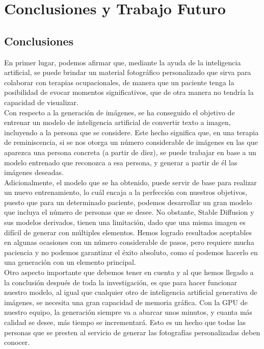 \chapter{Conclusiones y Trabajo Futuro}
\label{cap:conclusiones}

\section{Conclusiones}

En primer lugar, podemos afirmar que, mediante la ayuda de la inteligencia artificial, se puede brindar un material fotográfico personalizado que sirva para colaborar con terapias ocupacionales, de manera que un paciente tenga la posibilidad de evocar momentos significativos, que de otra manera no tendría la capacidad de visualizar.\\

Con respecto a la generación de imágenes, se ha conseguido el objetivo de entrenar un modelo de inteligencia artificial de convertir texto a imagen, incluyendo a la persona que se considere. Este hecho significa que, en una terapia de reminiscencia, si se nos otorga un número considerable de imágenes en las que aparezca una persona concreta (a partir de diez), se puede trabajar en base a un modelo entrenado que reconozca a esa persona, y generar a partir de él las imágenes deseadas.\\

Adicionalmente, el modelo que se ha obtenido, puede servir de base para realizar un nuevo entrenamiento, lo cuál encaja a la perfección con nuestros objetivos, puesto que para un determinado paciente, podemos desarrollar un gran modelo que incluya el número de personas que se desee. No obstante, Stable Diffusion y sus modelos derivados, tienen una limitación, dado que una misma imagen es difícil de generar con múltiples elementos. Hemos logrado resultados aceptables en algunas ocasiones con un número considerable de pasos, pero requiere mucha paciencia y no podemos garantizar el éxito absoluto, como sí podemos hacerlo en una generación con un elemento principal.\\

Otro aspecto importante que debemos tener en cuenta y al que hemos llegado a la conclusión después de toda la investigación, es que para hacer funcionar nuestro modelo, al igual que cualquier otro de inteligencia artificial generativa de imágenes, se necesita una gran capacidad de memoria gráfica. Con la GPU de nuestro equipo, la generación siempre va a abarcar unos minutos, y cuanta más calidad se desee, más tiempo se incrementará. Esto es un hecho que todas las personas que se presten al servicio de generar las fotografías personalizadas deben conocer.\\

